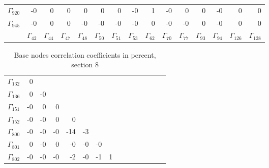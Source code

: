 {\begin{table}
\begin{center}
\begin{minipage}{\linewidth}
\begin{center}
\begin{envsmall}
\begin{center}
\begin{tabular}{rrrrrrrrrrrrrrr}
\( \Gamma_{920} \) &   -0 &    0 &    0 &    0 &    0 &    0 &   -0 &    1 &   -0 &    0 &    0 &   -0 &    0 &    0 \\
\( \Gamma_{945} \) &   -0 &    0 &    0 &   -0 &   -0 &   -0 &   -0 &    0 &   -0 &   -0 &    0 &   -0 &    0 &    0 \\
 & \( \Gamma_{42} \) & \( \Gamma_{44} \) & \( \Gamma_{47} \) & \( \Gamma_{48} \) & \( \Gamma_{50} \) & \( \Gamma_{51} \) & \( \Gamma_{53} \) & \( \Gamma_{62} \) & \( \Gamma_{70} \) & \( \Gamma_{77} \) & \( \Gamma_{93} \) & \( \Gamma_{94} \) & \( \Gamma_{126} \) & \( \Gamma_{128} \)
\\\hline
\end{tabular}
\end{center}
\end{envsmall}
\ifhevea\else
\end{center}
\end{minipage}
\fi
\end{center}
\ifhevea\end{table}\fi
\ifhevea\begin{table}\fi%
\begin{center}
\ifhevea
\caption{Base nodes correlation coefficients in percent, section 8\label{tab:br-fit-corr8}}%
\else
\begin{minipage}{\linewidth}
\begin{center}
\label{tab:br-fit-corr8}%
\fi
\begin{envsmall}
\begin{center}
\renewcommand*{\arraystretch}{1.1}%
\begin{tabular}{rrrrrrrrrrrrrrr}
\hline
\( \Gamma_{132} \) &    0 &  &  &  &  &  &  &  &  &  &  &  &  &  \\
\( \Gamma_{136} \) &    0 &   -0 &  &  &  &  &  &  &  &  &  &  &  &  \\
\( \Gamma_{151} \) &   -0 &    0 &    0 &  &  &  &  &  &  &  &  &  &  &  \\
\( \Gamma_{152} \) &   -0 &   -0 &    0 &    0 &  &  &  &  &  &  &  &  &  &  \\
\( \Gamma_{800} \) &   -0 &   -0 &   -0 &  -14 &   -3 &  &  &  &  &  &  &  &  &  \\
\( \Gamma_{801} \) &    0 &   -0 &    0 &   -0 &   -0 &   -0 &  &  &  &  &  &  &  &  \\
\( \Gamma_{802} \) &   -0 &   -0 &   -0 &   -2 &   -0 &   -1 &    1 &  &  &  &  &  &  &  \\

\end{tabular}
\end{center}
\end{envsmall}
\end{center}
\end{minipage}
\end{center}
\end{table}}
